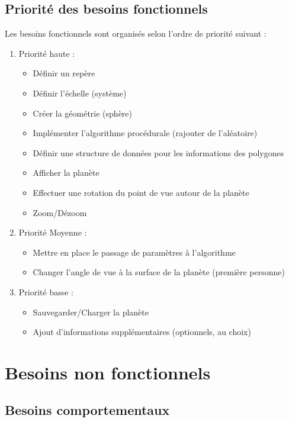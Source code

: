 \documentclass[a4paper]{article}
\begin{document}
\subsection{Priorité des besoins fonctionnels}

    Les besoins fonctionnels sont organisés selon l'ordre de priorité suivant :
    \begin{enumerate}
        \item Priorité haute : 
        \begin{itemize}
            \item Définir un repère
            \item Définir l'échelle (système)
            \item Créer la géométrie (sphère)
            \item Implémenter l'algorithme procédurale (rajouter de l'aléatoire)
            \item Définir une structure de données pour les informations des polygones
            \item Afficher la planète
            \item Effectuer une rotation du point de vue autour de la planète
            \item Zoom/Dézoom
        \end{itemize}
        \item Priorité Moyenne :
        \begin{itemize}
            \item Mettre en place le passage de paramètres à l'algorithme
            \item Changer l'angle de vue à la surface de la planète (première personne)
        \end{itemize}
        \item Priorité basse :
        \begin{itemize}
            \item Sauvegarder/Charger la planète
            \item Ajout d'informations supplémentaires (optionnels, au choix)
        \end{itemize}
    \end{enumerate}

\section{Besoins non fonctionnels}
    \subsection{Besoins comportementaux}
\end{document}
